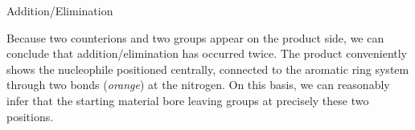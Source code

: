 \begin{core}[label=core:add_elim]{Addition/Elimination}
\begin{enumerate}

        Because two  counterions and two  groups appear on the product side, we can conclude that addition/elimination has occurred twice. The product conveniently shows the nucleophile positioned centrally, connected to the aromatic ring system through two bonds (\textit{orange}) at the nitrogen. On this basis, we can reasonably infer that the starting material bore leaving groups at precisely these two positions.


\end{enumerate}
\end{core}
